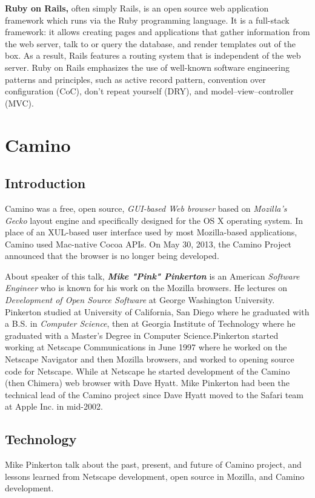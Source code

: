 \documentclass[11pt]{article}
\begin{document}
\textbf{Ruby on Rails,} often simply Rails, is an open source web application framework which runs via the Ruby programming language. It is a full-stack framework: it allows creating pages and applications that gather information from the web server, talk to or query the database, and render templates out of the box. As a result, Rails features a routing system that is independent of the web server. Ruby on Rails emphasizes the use of well-known software engineering patterns and principles, such as active record pattern, convention over configuration (CoC), don't repeat yourself (DRY), and model–view–controller (MVC).

\newpage


\section{Camino}

\subsection{Introduction}
Camino was a free, open source, \emph{GUI-based Web browser} based on \emph{Mozilla's Gecko }layout engine and specifically designed for the OS X operating system. In place of an XUL-based user interface used by most Mozilla-based applications, Camino used Mac-native Cocoa APIs. On May 30, 2013, the Camino Project announced that the browser is no longer being developed.

About speaker of this talk, \textbf{\emph{Mike "Pink" Pinkerton}} is an American \emph{Software Engineer} who is known for his work on the Mozilla browsers. He lectures on \emph{Development of Open Source Software} at George Washington University. Pinkerton studied at University of California, San Diego where he graduated with a B.S. in \emph{Computer Science}, then at Georgia Institute of Technology where he graduated with a Master's Degree in Computer Science.Pinkerton started working at Netscape Communications in June 1997 where he worked on the Netscape Navigator and then Mozilla browsers, and worked to opening source code for Netscape. While at Netscape he started development of the Camino (then Chimera) web browser with Dave Hyatt.  Mike Pinkerton had been the technical lead of the Camino project since Dave Hyatt moved to the Safari team at Apple Inc. in mid-2002.

\subsection{Technology}
Mike Pinkerton talk about the past, present, and future of Camino project, and lessons learned from Netscape development, open source in Mozilla, and Camino development.
\end{document}
